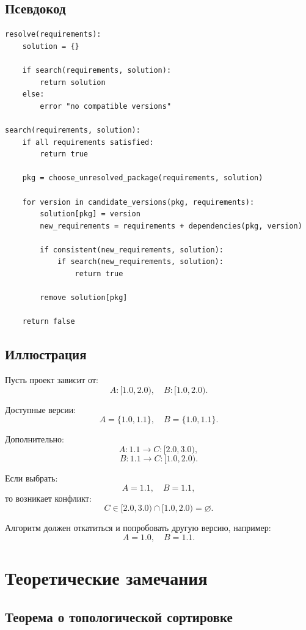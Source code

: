 \documentclass[12pt,a4paper]{article}
\begin{document}
\subsection{Псевдокод}

\begin{lstlisting}
resolve(requirements):
    solution = {}

    if search(requirements, solution):
        return solution
    else:
        error "no compatible versions"

search(requirements, solution):
    if all requirements satisfied:
        return true

    pkg = choose_unresolved_package(requirements, solution)

    for version in candidate_versions(pkg, requirements):
        solution[pkg] = version
        new_requirements = requirements + dependencies(pkg, version)

        if consistent(new_requirements, solution):
            if search(new_requirements, solution):
                return true

        remove solution[pkg]

    return false
\end{lstlisting}

\subsection{Иллюстрация}

Пусть проект зависит от:
\[
A: [1.0, 2.0), \quad B: [1.0, 2.0).
\]

Доступные версии:
\[
A = \{1.0, 1.1\}, \quad B = \{1.0, 1.1\}.
\]

Дополнительно:
\[
A:1.1 \rightarrow C: [2.0,3.0),
\]
\[
B:1.1 \rightarrow C: [1.0,2.0).
\]

Если выбрать:
\[
A=1.1,\quad B=1.1,
\]
то возникает конфликт:
\[
C \in [2.0,3.0) \cap [1.0,2.0) = \varnothing.
\]

Алгоритм должен откатиться и попробовать другую версию, например:
\[
A=1.0,\quad B=1.1.
\]

\section{Теоретические замечания}

\subsection{Теорема о топологической сортировке}
\end{document}
